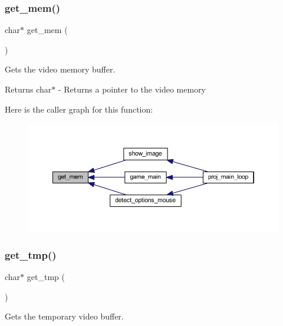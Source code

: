 \subsubsection{\texorpdfstring{get\+\_\+mem()}{get\_mem()}}
{\footnotesize\ttfamily char$\ast$ get\+\_\+mem (\begin{DoxyParamCaption}{ }\end{DoxyParamCaption})}



Gets the video memory buffer. 

\begin{DoxyReturn}{Returns}
char$\ast$ -\/ Returns a pointer to the video memory 
\end{DoxyReturn}
Here is the caller graph for this function\+:
\nopagebreak
\begin{figure}[H]
\begin{center}
\leavevmode
\includegraphics[width=350pt]{group__videog_ga753e43171fab6674507b8b8042be0906_icgraph}
\end{center}
\end{figure}
\mbox{\label{group__videog_gae16576a0c83561a7c462fb76956e06dc}} 
\subsubsection{\texorpdfstring{get\+\_\+tmp()}{get\_tmp()}}
{\footnotesize\ttfamily char$\ast$ get\+\_\+tmp (\begin{DoxyParamCaption}{ }\end{DoxyParamCaption})}



Gets the temporary video buffer. 

